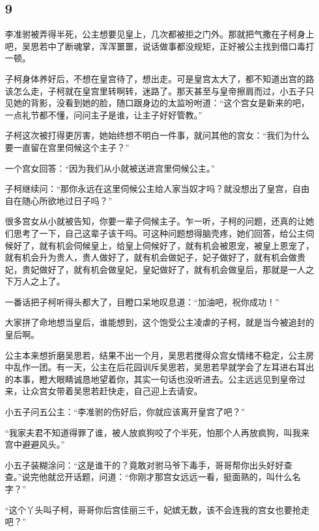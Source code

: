 {\centering\subsection{9}}

李准驸被弄得半死，公主想要见皇上，几次都被拒之门外。那就把气撒在子柯身上吧，吴思若中了断魂掌，浑浑噩噩，说话做事都没规矩，正好被公主找到借口毒打一顿。

子柯身体养好后，不想在皇宫待了，想出走。可是皇宫太大了，都不知道出宫的路该怎么走，子柯就在皇宫里转啊转，迷路了。那天甚至与皇帝擦肩而过，小五子只见她的背影，没看到她的脸，随口跟身边的太监吩咐道：“这个宫女是新来的吧，一点礼节都不懂，问问主子是谁，让主子好好管教。”

子柯这次被打得更厉害，她始终想不明白一件事，就问其他的宫女：“我们为什么要一直留在宫里伺候这个主子？”

一个宫女回答：“因为我们从小就被送进宫里伺候公主。”

子柯继续问：“那你永远在这里伺候公主给人家当奴才吗？就没想出了皇宫，自由自在随心所欲地过日子吗？”

很多宫女从小就被告知，你要一辈子伺候主子。乍一听，子柯的问题，还真的让她们思考了一下，自己这辈子该干吗。可这种问题想得脑壳疼，她们回答，给公主伺候好了，就有机会伺候皇上，给皇上伺候好了，就有机会被恩宠，被皇上恩宠了，就有机会升为贵人，贵人做好了，就有机会做妃子，妃子做好了，就有机会做贵妃，贵妃做好了，就有机会做皇妃，皇妃做好了，就有机会做皇后，那就是一人之下万人之上了。

一番话把子柯听得头都大了，目瞪口呆地叹息道：“加油吧，祝你成功！”

大家拼了命地想当皇后，谁能想到，这个饱受公主凌虐的子柯，就是当今被追封的皇后啊。
\newline

公主本来想折磨吴思若，结果不出一个月，吴思若搅得众宫女情绪不稳定，公主房中乱作一团。有一天，公主在后花园训斥吴思若，吴思若早就学会了左耳进右耳出的本事，瞪大眼睛诚恳地望着你，其实一句话也没听进去。公主远远见到皇帝过来，让众宫女带着吴思若赶快走，自己迎上去请安。

小五子问五公主：“李准驸的伤好后，你就应该离开皇宫了吧？”

“我家夫君不知道得罪了谁，被人放疯狗咬了个半死，怕那个人再放疯狗，叫我来宫中避避风头。”

小五子装糊涂问：“这是谁干的？竟敢对驸马爷下毒手，哥哥帮你出头好好查查。”说完他就岔开话题，问道：“你刚才那宫女远远一看，挺面熟的，叫什么名字？”

“这个丫头叫子柯，哥哥你后宫佳丽三千，妃嫔无数，该不会连我的宫女也要抢走吧？”


